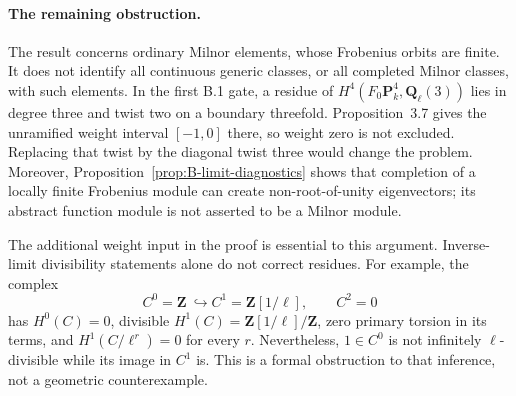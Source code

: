 \paragraph{The remaining obstruction.}
The result concerns ordinary Milnor elements, whose Frobenius
orbits are finite.  It does not identify all continuous generic
classes, or all completed Milnor classes, with such elements.
In the first B.1 gate, a residue of
$H^4(F_0\mathbf P^4_k,\mathbf Q_\ell(3))$ lies in degree three
and twist two on a boundary threefold.  Proposition~3.7 gives the
unramified weight interval $[-1,0]$ there, so weight zero is not
excluded.  Replacing that twist by the diagonal twist three would
change the problem.  Moreover, Proposition~\ref{prop:B-limit-diagnostics}
shows that completion of a locally finite Frobenius module can
create non-root-of-unity eigenvectors; its abstract function module
is not asserted to be a Milnor module.

The additional weight input in the proof is essential to this
argument.  Inverse-limit divisibility statements alone do not
correct residues.  For example, the complex
\[
 C^0=\mathbf Z\ \hookrightarrow C^1=\mathbf Z[1/\ell],\qquad C^2=0
\]
has $H^0(C)=0$, divisible $H^1(C)=\mathbf Z[1/\ell]/\mathbf Z$,
zero primary torsion in its terms, and $H^1(C/\ell^r)=0$ for every
$r$.  Nevertheless, $1\in C^0$ is not infinitely $\ell$-divisible
while its image in $C^1$ is.  This is a formal obstruction to that
inference, not a geometric counterexample.
